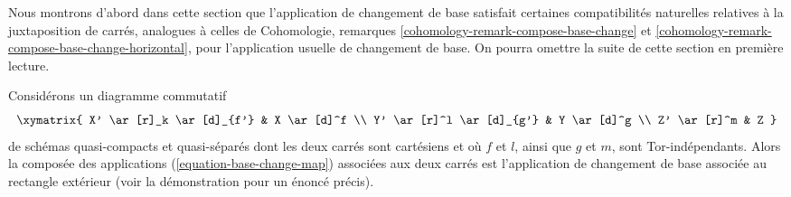 \medskip\noindent
Nous montrons d'abord dans cette section que l'application de changement de base satisfait certaines compatibilités naturelles relatives à la juxtaposition de carrés, analogues à celles de Cohomologie, remarques \ref{cohomology-remark-compose-base-change} et \ref{cohomology-remark-compose-base-change-horizontal}, pour l'application usuelle de changement de base. On pourra omettre la suite de cette section en première lecture.

\begin{lemma}
\label{lemma-compose-base-change-maps}
Considérons un diagramme commutatif
$$
\xymatrix{
X' \ar[r]_k \ar[d]_{f'} & X \ar[d]^f \\
Y' \ar[r]^l \ar[d]_{g'} & Y \ar[d]^g \\
Z' \ar[r]^m & Z
}
$$
de schémas quasi-compacts et quasi-séparés dont les deux carrés sont cartésiens et où $f$ et $l$, ainsi que $g$ et $m$, sont Tor-indépendants. Alors la composée des applications (\ref{equation-base-change-map}) associées aux deux carrés est l'application de changement de base associée au rectangle extérieur (voir la démonstration pour un énoncé précis).
\end{lemma}

